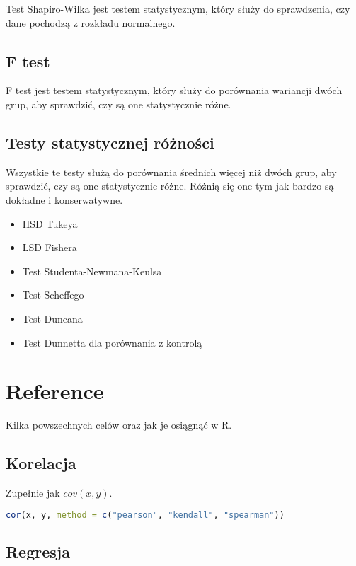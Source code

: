 \documentclass{../notatki}
\begin{document}
Test Shapiro-Wilka jest testem statystycznym, który służy do
sprawdzenia, czy dane pochodzą z rozkładu normalnego.

\subsection{F test}

F test jest testem statystycznym, który służy do porównania
wariancji dwóch grup, aby sprawdzić, czy są one
statystycznie różne.

\subsection{Testy statystycznej różności}

Wszystkie te testy służą do porównania średnich więcej niż dwóch grup, aby
sprawdzić, czy są one statystycznie różne. Różnią się one tym jak bardzo
są dokładne i konserwatywne.

\begin{itemize}
  \item HSD Tukeya
  \item LSD Fishera
  \item Test Studenta-Newmana-Keulsa
  \item Test Scheffego
  \item Test Duncana
  \item Test Dunnetta dla porównania z kontrolą
\end{itemize}

\section{Reference}

Kilka powszechnych celów oraz jak je osiągnąć w R.

\subsection{Korelacja}

Zupełnie jak $cov(x, y)$.

\begin{lstlisting}[language=R, caption=oblicz korelację]
cor(x, y, method = c("pearson", "kendall", "spearman"))
\end{lstlisting}

\subsection{Regresja}
\end{document}
